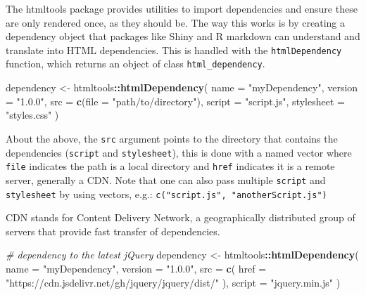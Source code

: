 \documentclass[
]{krantz}
\makeatletter
\newenvironment{Shaded}{\begin{snugshade}}{\end{snugshade}}
\newcommand{\CommentTok}[1]{\textcolor[rgb]{0.37,0.37,0.37}{\textit{#1}}}
\newcommand{\DataTypeTok}[1]{\textcolor[rgb]{0.27,0.27,0.27}{#1}}
\newcommand{\KeywordTok}[1]{\textcolor[rgb]{0.27,0.27,0.27}{\textbf{#1}}}
\newcommand{\NormalTok}[1]{#1}
\newcommand{\OperatorTok}[1]{\textcolor[rgb]{0.43,0.43,0.43}{\textbf{#1}}}
\newcommand{\StringTok}[1]{\textcolor[rgb]{0.5,0.5,0.5}{#1}}
\newenvironment{kframe}{%
\medskip{}
\setlength{\fboxsep}{.8em}
 \def\at@end@of@kframe{}%
 \ifinner\ifhmode%
  \def\at@end@of@kframe{\end{minipage}}%
  \begin{minipage}{\columnwidth}%
 \fi\fi%
 \def\FrameCommand##1{\hskip\@totalleftmargin \hskip-\fboxsep
 \colorbox{shadecolor}{##1}\hskip-\fboxsep
     \hskip-\linewidth \hskip-\@totalleftmargin \hskip\columnwidth}%
 \MakeFramed {\advance\hsize-\width
   \@totalleftmargin\z@ \linewidth\hsize
   \@setminipage}}%
 {\par\unskip\endMakeFramed%
 \at@end@of@kframe}
\renewenvironment{Shaded}{\begin{kframe}}{\end{kframe}}
\newenvironment{rmdblock}[1]
  {
  \begin{itemize}
  \renewcommand{\labelitemi}{
    \raisebox{-.7\height}[0pt][0pt]{
      {\setkeys{Gin}{width=3em,keepaspectratio}\texttt{[image: images/\#1]}}
    }
  }
  \setlength{\fboxsep}{1em}
  \begin{kframe}
  \item
  }
  {
  \end{kframe}
  \end{itemize}
  }
\newenvironment{rmdnote}
  {\begin{rmdblock}{note}}
  {\end{rmdblock}}
\makeatother
\begin{document}
The htmltools package provides utilities to import dependencies and ensure these are only rendered once, as they should be. The way this works is by creating a dependency object that packages like Shiny and R markdown can understand and translate into HTML dependencies. This is handled with the \texttt{htmlDependency} function, which returns an object of class \texttt{html\_dependency}.

\begin{Shaded}
\begin{Highlighting}[]
\NormalTok{dependency <{-}}\StringTok{ }\NormalTok{htmltools}\OperatorTok{::}\KeywordTok{htmlDependency}\NormalTok{(}
  \DataTypeTok{name =} \StringTok{"myDependency"}\NormalTok{,}
  \DataTypeTok{version =} \StringTok{"1.0.0"}\NormalTok{,}
  \DataTypeTok{src =} \KeywordTok{c}\NormalTok{(}\DataTypeTok{file =} \StringTok{"path/to/directory"}\NormalTok{),}
  \DataTypeTok{script =} \StringTok{"script.js"}\NormalTok{,}
  \DataTypeTok{stylesheet =} \StringTok{"styles.css"}
\NormalTok{)}
\end{Highlighting}
\end{Shaded}

About the above, the \texttt{src} argument points to the directory that contains the dependencies (\texttt{script} and \texttt{stylesheet}), this is done with a named vector where \texttt{file} indicates the path is a local directory and \texttt{href} indicates it is a remote server, generally a CDN. Note that one can also pass multiple \texttt{script} and \texttt{stylesheet} by using vectors, e.g.: \texttt{c("script.js",\ "anotherScript.js")}

\begin{rmdnote}
CDN stands for Content Delivery Network, a geographically distributed
group of servers that provide fast transfer of dependencies.
\end{rmdnote}

\begin{Shaded}
\begin{Highlighting}[]
\CommentTok{\# dependency to the latest jQuery}
\NormalTok{dependency <{-}}\StringTok{ }\NormalTok{htmltools}\OperatorTok{::}\KeywordTok{htmlDependency}\NormalTok{(}
  \DataTypeTok{name =} \StringTok{"myDependency"}\NormalTok{,}
  \DataTypeTok{version =} \StringTok{"1.0.0"}\NormalTok{,}
  \DataTypeTok{src =} \KeywordTok{c}\NormalTok{(}
    \DataTypeTok{href =} \StringTok{"https://cdn.jsdelivr.net/gh/jquery/jquery/dist/"}
\NormalTok{  ),}
  \DataTypeTok{script =} \StringTok{"jquery.min.js"}
\NormalTok{)}
\end{Highlighting}
\end{Shaded}
\end{document}
